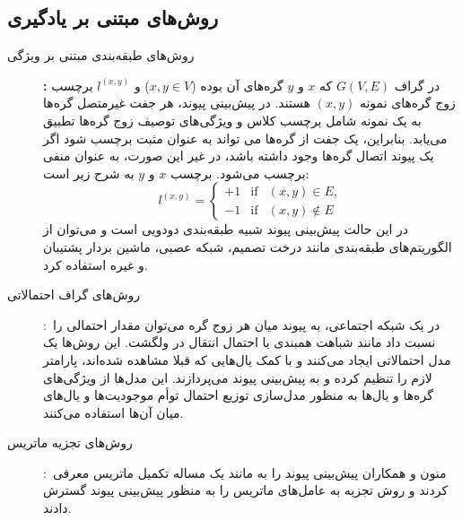 \subsection{روش‌های مبتنی بر یادگیری}
\begin{description}
  \item[روش‌های طبقه‌بندی مبتنی بر ویژگی]\textbf{:}
در گراف $G(V, E)$ که $x$ و $y$ گره‌های آن بوده ($ x,y \in V$) و $l^{(x,y)}$ برچسب زوج گره‌های نمونه $(x,y)$ هستند. در پیش‌بینی پیوند، هر جفت غیرمتصل گره‌ها به یک نمونه شامل برچسب کلاس و ویژگی‌های توصیف زوج گره‌ها تطبیق می‌یابد. بنابراین، یک جفت از گره‌ها می تواند به عنوان مثبت برچسب شود اگر یک پیوند اتصال گره‌ها وجود داشته باشد، در غیر این صورت، به عنوان منفی برچسب می‌شود. برچسب $x$ و $y$ به شرح زیر است:
\begin{equation}
            l^{(x,y)}=  \left\{
              \begin{array}{lcl}
                +1 & \text{if} &  (x,y) \in E  ,\\
                -1 & \text{if} &  (x,y) \notin E
              \end{array} \right.
\end{equation}
در این حالت پیش‌بینی پیوند شبیه طبقه‌بندی دودویی است و می‌توان از الگوریتم‌های طبقه‌بندی مانند درخت تصمیم، شبکه عصبی، ماشین بردار پشتیبان و غیره استفاده کرد.
  \item[روش‌های گراف احتمالاتی]:\ 
در یک شبکه اجتماعی، به پیوند میان هر زوج گره می‌توان مقدار احتمالی را نسبت داد مانند شباهت همبندی یا احتمال انتقال در ولگشت. این روش‌ها یک مدل احتمالاتی ایجاد می‌کنند و با کمک یال‌هایی که قبلا مشاهده شده‌اند، پارامتر لازم را تنظیم کرده و به پیش‌بینی پیوند می‌پردازند. این مدل‌ها از ویژگی‌های گره‌ها و یال‌ها به منظور مدل‌سازی توزیع احتمال توأم موجودیت‌ها و یال‌های میان آن‌ها استفاده می‌کنند. 
  \item[روش‌های تجزیه ماتریس]:\ 
منون\LTRfootnote{Menon} و همکاران پیش‌بینی پیوند را به مانند یک مساله تکمیل ماتریس معرفی کردند و روش تجزیه به عامل‌های ماتریس را به منظور پیش‌بینی پیوند گسترش دادند\cite{menon2011link}.

\end{description}
